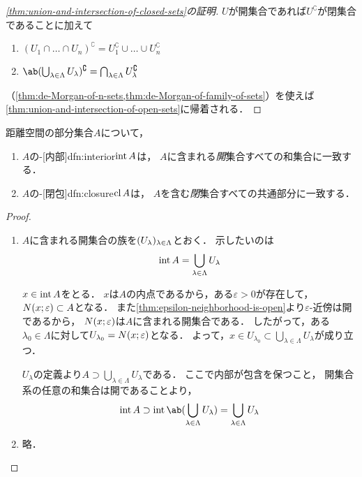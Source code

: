 \documentclass[../sotsu.tex]{subfiles}
\begin{document}
\begin{proof}[\cref{thm:union-and-intersection-of-closed-sets}の証明]
    $U$が開集合であれば$U^\complement$が閉集合であることに加えて
    \begin{enumerate}
        \item $(U_1 \cap \dots \cap U_n)^\complement = U_1^\complement \cup \dots \cup U_n^\complement$
        \item $\ab( \bigcup_{\lambda \in \Lambda} U_\lambda )^\complement = \bigcap_{\lambda \in \Lambda} U_\lambda^\complement $
    \end{enumerate}
    （\cref{thm:de-Morgan-of-n-sets,thm:de-Morgan-of-family-of-sets}）を使えば\cref{thm:union-and-intersection-of-open-sets}に帰着される．
\end{proof}


\begin{proposition}
    \label{thm:interior-and-closure-by-all-open-and-closed-sets}
    距離空間の部分集合$A$について，
    \begin{enumerate}
        \item $A$の-[内部]{dfn:interior}$\operatorname{int}{A}$は，
            $A$に含まれる\emph{開}集合すべての和集合に一致する．
        \item $A$の-[閉包]{dfn:closure}$\operatorname{cl}{A}$は，
            $A$を含む\emph{閉}集合すべての共通部分に一致する．
    \end{enumerate}
\end{proposition}

\begin{proof}
    \begin{enumerate}
        \item $A$に含まれる開集合の族を$\sequ{U_\lambda}[\lambda \in \Lambda]$とおく．
            示したいのは
                \[  \operatorname{int}{A} = \bigcup_{\lambda \in \Lambda} U_\lambda  \]
        
            \quad
            $x \in \operatorname{int}{A}$をとる．
            $x$は$A$の内点であるから，ある$\varepsilon > 0$が存在して，
            $N(x; \varepsilon) \subset A$となる．
            また\cref{thm:epsilon-neighborhood-is-open}より$\varepsilon$-近傍は開であるから，
            $N(x; \varepsilon)$は$A$に含まれる開集合である．
            したがって，ある$\lambda_0 \in \Lambda$に対して$U_{\lambda_0} = N(x; \varepsilon)$となる．
            よって，$x \in U_{\lambda_0} \subset \bigcup_{\lambda \in \Lambda} U_\lambda$が成り立つ．

            \quad
            $U_\lambda$の定義より$A \supset \bigcup_{\lambda \in \Lambda} U_\lambda$である．
            ここで内部が包含を保つこと，
            開集合系の任意の和集合は開であることより，
            \[  \interr{A} 
                    \supset \interr{\ab(\bigcup_{\lambda \in \Lambda} U_\lambda)}
                    = \bigcup_{\lambda \in \Lambda} U_\lambda  \]

        \item 略．\qedhere
    \end{enumerate}
\end{proof}
\end{document}
